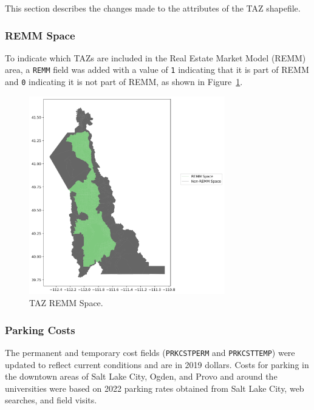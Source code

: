 \documentclass[
  letterpaper,
  DIV=11,
  numbers=noendperiod]{scrreprt}
\begin{document}
This section describes the changes made to the attributes of the TAZ
shapefile.

\hypertarget{remm-space}{%
\subsubsection{REMM Space}\label{remm-space}}

To indicate which TAZs are included in the Real Estate Market Model
(REMM) area, a \texttt{REMM} field was added with a value of \texttt{1}
indicating that it is part of REMM and \texttt{0} indicating it is not
part of REMM, as shown in Figure~\ref{fig-taz-remm-space-pdf}.

\begin{figure}[H]

{\centering \includegraphics[width=0.76\textwidth,height=\textheight]{v9x/v900/whats-new/_pictures/pdf-remm.png}

}

\caption{\label{fig-taz-remm-space-pdf}TAZ REMM Space.}

\end{figure}

\hypertarget{parking-costs}{%
\subsubsection{Parking Costs}\label{parking-costs}}

The permanent and temporary cost fields (\texttt{PRKCSTPERM} and
\texttt{PRKCSTTEMP}) were updated to reflect current conditions and are
in 2019 dollars. Costs for parking in the downtown areas of Salt Lake
City, Ogden, and Provo and around the universities were based on 2022
parking rates obtained from Salt Lake City, web searches, and field
visits.
\end{document}
